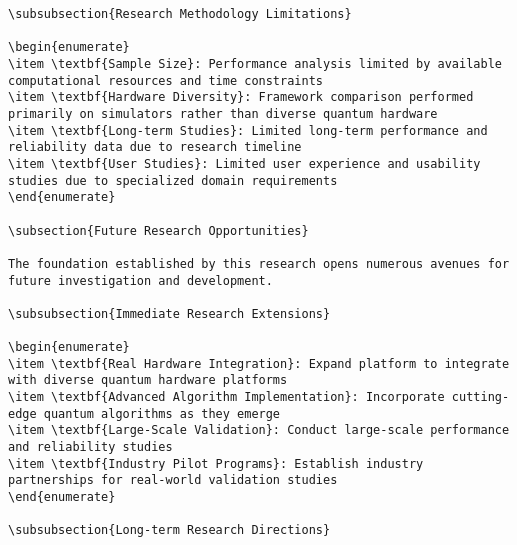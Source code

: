\documentclass[12pt,a4paper]{report}
\begin{document}
\begin{lstlisting}
\subsubsection{Research Methodology Limitations}

\begin{enumerate}
\item \textbf{Sample Size}: Performance analysis limited by available computational resources and time constraints
\item \textbf{Hardware Diversity}: Framework comparison performed primarily on simulators rather than diverse quantum hardware
\item \textbf{Long-term Studies}: Limited long-term performance and reliability data due to research timeline
\item \textbf{User Studies}: Limited user experience and usability studies due to specialized domain requirements
\end{enumerate}

\subsection{Future Research Opportunities}

The foundation established by this research opens numerous avenues for future investigation and development.

\subsubsection{Immediate Research Extensions}

\begin{enumerate}
\item \textbf{Real Hardware Integration}: Expand platform to integrate with diverse quantum hardware platforms
\item \textbf{Advanced Algorithm Implementation}: Incorporate cutting-edge quantum algorithms as they emerge
\item \textbf{Large-Scale Validation}: Conduct large-scale performance and reliability studies
\item \textbf{Industry Pilot Programs}: Establish industry partnerships for real-world validation studies
\end{enumerate}

\subsubsection{Long-term Research Directions}


\end{lstlisting}
\end{document}
